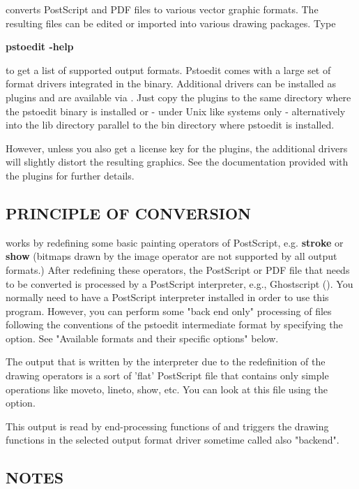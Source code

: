 \documentclass[english,a4paper]{article}
\begin{document}
 converts PostScript and PDF files to various vector graphic
formats. The resulting files can be edited or imported into various drawing
packages. Type

     \textbf{pstoedit -help}

\noindent to get a list of supported output formats. Pstoedit comes with a
large set of format drivers integrated in the binary. Additional drivers can be
installed as plugins and are available via
.
Just copy the plugins to the same directory where the pstoedit binary is installed or - under Unix like systems only - alternatively into the lib directory parallel to the bin directory where pstoedit is installed.

However, unless you also get a license key for the plugins, the additional
drivers will slightly distort the resulting graphics. See the documentation
provided with the plugins for further details.

\subsection{PRINCIPLE OF CONVERSION}

 works by redefining some basic painting operators of
PostScript, e.g. \textbf{stroke} or \textbf{show} (bitmaps drawn by the image
operator are not supported by all output formats.) After
redefining these operators, the PostScript or PDF file that needs to be
converted is processed by a PostScript interpreter, e.g., Ghostscript
(). You normally need to have a PostScript interpreter installed in
order to use this program. However, you can perform some "back end only" processing
of files following the conventions of the pstoedit intermediate format by specifying the  option. See "Available formats and their specific options" below.

The output that is written by the interpreter due to the redefinition of the
drawing operators is a sort of 'flat' PostScript file that contains only simple
operations like moveto, lineto, show, etc. You can look at this file using the
 option.

This output is read by end-processing functions of  and triggers
the drawing functions in the selected output format driver sometime called also "backend".

\subsection{NOTES}
\end{document}
